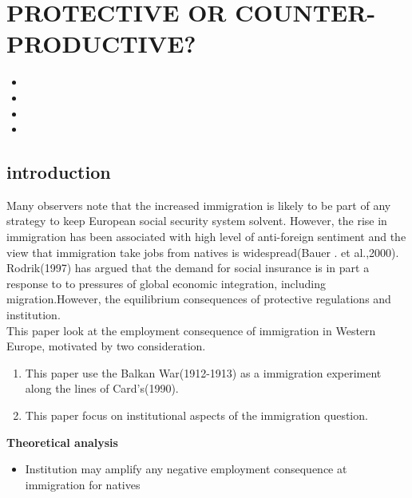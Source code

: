\documentclass[../root]{subfiles}
\begin{document}
    \chapter{PROTECTIVE OR COUNTER-PRODUCTIVE?}

    \begin{shortsummary}
        \begin{itemize}
            \item {}
            \item {}
            \item {}
            \item {}
        \end{itemize}
    \end{shortsummary}

    \section{introduction}
    
    Many observers note that the increased immigration is likely to be part of any strategy to keep European social security system solvent. 
    However, the rise in immigration has been associated with high level  of anti-foreign sentiment and the view that immigration take jobs from natives is widespread(Bauer . et al.,2000). \\
    Rodrik(1997) has argued that the demand for social insurance is in part a response to to pressures of global economic integration, including migration.However, the equilibrium consequences of protective regulations and institution. \\
     This paper look at the employment consequence of immigration in Western Europe, motivated by two consideration.  
     \begin{enumerate}
         \item This paper use the Balkan War(1912-1913) as a immigration experiment along the lines of Card's(1990). 
         \item This paper focus on institutional aspects of the immigration question.
    \end{enumerate}
    {\bf Theoretical analysis}
    \begin{itemize}
        \item Institution may amplify any negative employment consequence at immigration for natives
    \end{itemize}
     
\end{document}
